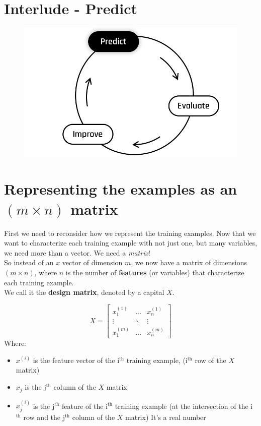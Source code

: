 \section*{Interlude - Predict}
\begin{figure}[!h]
  \centering
  \includegraphics[scale=0.2]{assets/Predict.png}
\end{figure}
\section*{Representing the examples as an $(m \times n)$ matrix}
First we need to reconsider how we represent the training examples.
Now that we want to characterize each training example with not just one,
 but many variables, we need more than a vector. We need a \textit{matrix}!\\
\newline
So instead of an $x$ vector of dimension $m$, we now have a matrix 
of dimensions $(m \times n)$, where $n$ is the number of \textbf{features}
 (or variables) that characterize each training example.\\
\newline
We call it the \textbf{design matrix}, denoted by a capital $X$.   

$$
X = \begin{bmatrix} 
x_{1}^{(1)} & \dots & x_{n}^{(1)}\\
\vdots & \ddots & \vdots\\
x_{1}^{(m)} & \dots & x_{n}^{(m)}\end{bmatrix}
$$
Where:
\begin{itemize}
    \item $x^{(i)}$ is the feature vector of the i$^\text{th}$ training example, (i$^\text{th}$ row of the $X$ matrix)
    \item $x_{j}$ is the j$^\text{th}$ column of the $X$ matrix
    \item $x_{j}^{(i)}$ is the j$^\text{th}$ feature of the i$^\text{th}$ training example (at the intersection of the i$^\text{th}$ row and the j$^\text{th}$ column of the $X$ matrix)
          It's a real number
\end{itemize}

